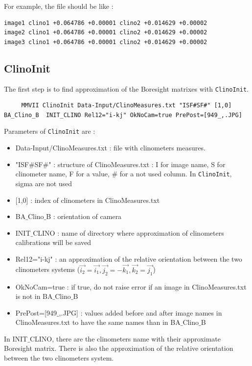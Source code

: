 For example, the file should be like :

\begin{lstlisting}
image1 clino1 +0.064786 +0.00001 clino2 +0.014629 +0.00002
image2 clino1 +0.064786 +0.00001 clino2 +0.014629 +0.00002
image3 clino1 +0.064786 +0.00001 clino2 +0.014629 +0.00002
\end{lstlisting}



\subsection{ClinoInit}

The first step is to find approximation of the Boresight matrixes with {\tt ClinoInit}.

\begin{lstlisting}
     MMVII ClinoInit Data-Input/ClinoMeasures.txt "ISF#SF#" [1,0] BA_Clino_B  INIT_CLINO Rel12="i-kj" OkNoCam=true PrePost=[949_,.JPG]
\end{lstlisting}


Parameters of {\tt ClinoInit} are :
\begin{itemize}
     \item Data-Input/ClinoMeasures.txt : file with clinometers measures.
     \item "ISF\#SF\#" : structure of ClinoMeasures.txt : I for image name, S for clinometer name, F for a value, \# for a not used column. In {\tt ClinoInit}, sigma are not used
     \item $[$1,0$]$ : index of clinometers in ClinoMeasures.txt
     \item BA$\_$Clino$\_$B : orientation of camera
     \item INIT$\_$CLINO : name of directory where approximation of clinometers calibrations will be saved
     \item Rel12="i-kj" : an approximation of the relative orientation between the two clinometers systems ($\Vec{i_2}=\Vec{i_1}, \Vec{j_2}=-\Vec{k_1}, \Vec{k_2}=\Vec{j_1}$)
     \item OkNoCam=true : if true, do not raise error if an image in ClinoMeasures.txt is not in BA$\_$Clino$\_$B
     \item PrePost=[949$\_$,.JPG] : values added before and after image names in ClinoMeasures.txt to have the same names than in BA$\_$Clino$\_$B
\end{itemize}

In INIT$\_$CLINO, there are the clinometers name with their approximate Boresight matrix. There is also the approximation of the relative orientation between the two clinometers system.



